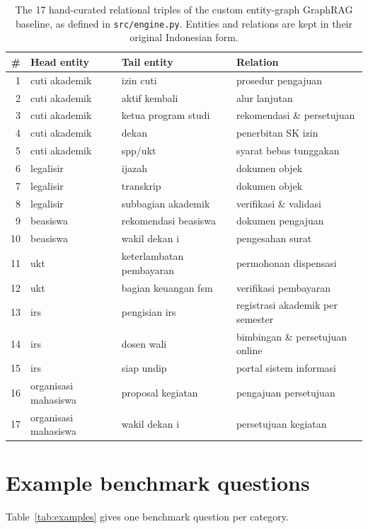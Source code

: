 \documentclass[preprint,10pt]{elsarticle}
\begin{document}
\begin{table}[!htbp]
\centering
\caption{The 17 hand-curated relational triples of the custom entity-graph GraphRAG baseline, as defined in \texttt{src/engine.py}. Entities and relations are kept in their original Indonesian form.}
\label{tab:triples}
\scriptsize
\setlength{\tabcolsep}{4pt}
\begin{tabular}{rlll}
\toprule
\# & Head entity & Tail entity & Relation \\
\midrule
1 & cuti akademik & izin cuti & prosedur pengajuan \\
2 & cuti akademik & aktif kembali & alur lanjutan \\
3 & cuti akademik & ketua program studi & rekomendasi \& persetujuan \\
4 & cuti akademik & dekan & penerbitan SK izin \\
5 & cuti akademik & spp/ukt & syarat bebas tunggakan \\
6 & legalisir & ijazah & dokumen objek \\
7 & legalisir & transkrip & dokumen objek \\
8 & legalisir & subbagian akademik & verifikasi \& validasi \\
9 & beasiswa & rekomendasi beasiswa & dokumen pengajuan \\
10 & beasiswa & wakil dekan i & pengesahan surat \\
11 & ukt & keterlambatan pembayaran & permohonan dispensasi \\
12 & ukt & bagian keuangan fsm & verifikasi pembayaran \\
13 & irs & pengisian irs & registrasi akademik per semester \\
14 & irs & dosen wali & bimbingan \& persetujuan online \\
15 & irs & siap undip & portal sistem informasi \\
16 & organisasi mahasiswa & proposal kegiatan & pengajuan persetujuan \\
17 & organisasi mahasiswa & wakil dekan i & persetujuan kegiatan \\
\bottomrule
\end{tabular}
\end{table}

\section{Example benchmark questions}
\label{app:examples}
Table~\ref{tab:examples} gives one benchmark question per category.
\end{document}
